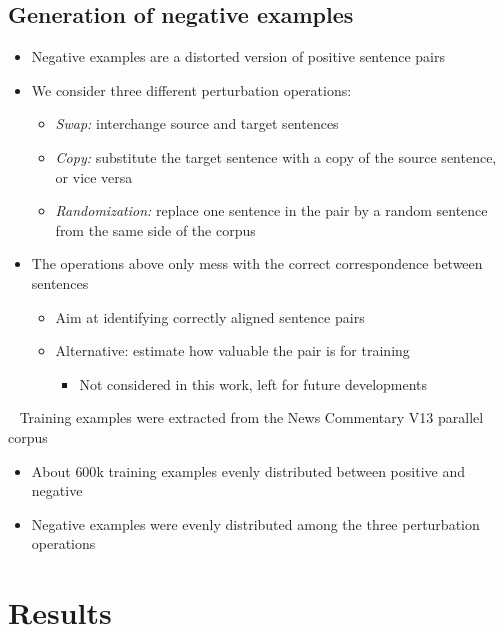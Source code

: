 \documentclass[a0]{sciposter}
\begin{document}
\begin{multicols*}{2}
\subsection*{Generation of negative examples}
\begin{itemize}
  \item Negative examples are a distorted version of positive sentence pairs~\cite{Hainan17}
  \item We consider three different perturbation operations:
  \begin{itemize}
  \item \textit{Swap:} interchange source and target sentences
  \item \textit{Copy:} substitute the target sentence with a copy of the source sentence, or vice versa
  \item \textit{Randomization:} replace one sentence in the pair by a random sentence from the same side of the corpus
  \end{itemize}
  \item The operations above only mess with the correct correspondence between sentences
  \begin{itemize}
    \item Aim at identifying correctly aligned sentence pairs
    \item Alternative: estimate how valuable the pair is for training
    \begin{itemize}
      \item Not considered in this work, left for future developments
    \end{itemize}
  \end{itemize}
\end{itemize}

~\newline
Training examples were extracted from the News Commentary V13 parallel corpus
\begin{itemize}
  \item About $600$k training examples evenly distributed between positive and negative
  \item Negative examples were evenly distributed among the three perturbation operations
\end{itemize}





\section*{\Large Results}


\end{multicols*}
\end{document}
